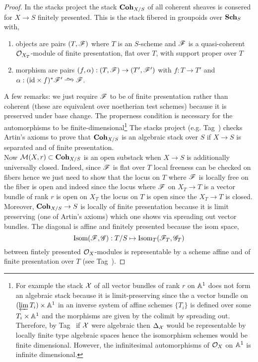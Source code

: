 \documentclass[12pt]{article}
\begin{document}
\begin{proof}
In the stacks project the stack $\mathbf{Coh}_{X/S}$ of all coherent sheaves is consered for $X \to S$ finitely presented. This is the stack fibered in groupoids over $\mathbf{Sch}_S$ with,
\begin{enumerate}
\item objects are pairs $(T, \mathscr{F})$ where $T$ is an $S$-scheme and $\mathscr{F}$ is a quasi-coherent $\mathcal{O}_{X_T}$-module of finite presentation, flat over $T$, with support proper over $T$
\item morphism are pairs $(f, \alpha) : (T, \mathscr{F}) \to (T', \mathscr{F}')$ with $f : T \to T'$ and $\alpha : (\id \times f)^* \F' \iso \F$.
\end{enumerate}
A few remarks: we just require $\mathscr{F}$ to be of finite presentation rather than coherent (these are equivalent over noetherian test schemes) because it is preserved under base change. The properness condition is necessary for the automorphisms to be finite-dimensional\footnote{For example the stack $\mathcal{X}$ of all vector bundles of rank $r$ on $\mathbb{A}^1$ does not form an algebraic stack because it is limit-preserving since the a vector bundle on $(\operatorname*{\varprojlim} T_i) \times \mathbb{A}^1$ in an inverse system of affine schemes $\{ T_i \}$ is defined over some $T_i \times \mathbb{A}^1$ and the morphisms are given by the colimit by spreading out. Therefore, by Tag~ if $\mathcal{X}$ were algebraic then $\Delta_{\mathcal{X}}$ would be representable by locally finite type algebraic spaces hence the isomorphism schemes would be finite dimensional. However, the infinitesimal automorphisms of $\mathcal{O}_{X}$ on $\mathbb{A}^1$ is infinite dimensional.}
The stacks project (e.g. Tag~) checks Artin's axioms to prove that $\mathbf{Coh}_{X/S}$ is an algebraic stack over $S$ if $X \to S$ is separated and of finite presentation.
\bigskip\\
Now $\mathcal{M}(X, r) \subset \mathbf{Coh}_{X/S}$ is an open substack when $X \to S$ is additionally universally closed. Indeed, since $\mathscr{F}$ is flat over $T$ local freeness can be checked on fibers hence we just need to show that the locus on $T$ where $\mathscr{F}$ is locally free on the fiber is open and indeed since the locus where $\mathscr{F}$ on $X_T \to T$ is a vector bundle of rank $r$ is open on $X_T$ the locus on $T$ is open since the $X_T \to T$ is closed.
\bigskip\\
Moreover, $\mathbf{Coh}_{X/S} \to S$ is locally of finite presentation because it is limit preserving (one of Artin's axioms) which one shows via spreading out vector bundles. The diagonal is affine and finitely presented because the isom space,
\[ \mathrm{Isom}(\mathscr{F}, \mathscr{G}) : T/S \mapsto \mathrm{Isom}_{T}(\mathscr{F}_T, \mathscr{G}_T) \]
between fintely presented $\mathcal{O}_{X}$-modules is representable by a scheme affine and of finite presentation over $T$ (see Tag~).
\end{proof}
\end{document}
